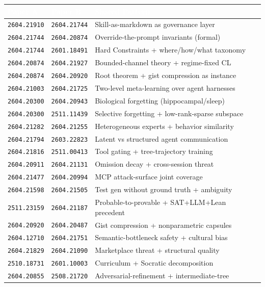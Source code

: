 \documentclass[11pt,letterpaper]{article}
\newcommand{\arxivid}[1]{\texttt{\textcolor{accent}{#1}}}
\newcommand{\tableheader}[1]{\textbf{\sffamily\textcolor{white}{#1}}}
\begin{document}
\begin{center}
\begin{tabularx}{\textwidth}{L{2.5cm}L{2.5cm}X}
\toprule
{}
\tableheader{Paper A} & \tableheader{Paper B} & \tableheader{Shared Pattern} \\
\midrule
\arxivid{2604.21910} & \arxivid{2604.21744} & Skill-as-markdown as governance layer \\
\arxivid{2604.21744} & \arxivid{2604.20874} & Override-the-prompt invariants (formal) \\
\arxivid{2604.21744} & \arxivid{2601.18491} & Hard Constraints + where/how/what taxonomy \\
\arxivid{2604.20874} & \arxivid{2604.21927} & Bounded-channel theory + regime-fixed CL \\
\arxivid{2604.20874} & \arxivid{2604.20920} & Root theorem + gist compression as instance \\
\arxivid{2604.21003} & \arxivid{2604.21725} & Two-level meta-learning over agent harnesses \\
\arxivid{2604.20300} & \arxivid{2604.20943} & Biological forgetting (hippocampal/sleep) \\
\arxivid{2604.20300} & \arxivid{2511.11439} & Selective forgetting + low-rank-sparse subspace \\
\arxivid{2604.21282} & \arxivid{2604.21255} & Heterogeneous experts + behavior similarity \\
\arxivid{2604.21794} & \arxivid{2603.22823} & Latent vs structured agent communication \\
\arxivid{2604.21816} & \arxivid{2511.00413} & Tool gating + tree-trajectory training \\
\arxivid{2604.20911} & \arxivid{2604.21131} & Omission decay + cross-session threat \\
\arxivid{2604.21477} & \arxivid{2604.20994} & MCP attack-surface joint coverage \\
\arxivid{2604.21598} & \arxivid{2604.21505} & Test gen without ground truth + ambiguity \\
\arxivid{2511.23159} & \arxivid{2604.21187} & Probable-to-provable + SAT+LLM+Lean precedent \\
\arxivid{2604.20920} & \arxivid{2604.20487} & Gist compression + nonparametric capsules \\
\arxivid{2604.12710} & \arxivid{2604.21751} & Semantic-bottleneck safety + cultural bias \\
\arxivid{2604.21829} & \arxivid{2604.21090} & Marketplace threat + structural quality \\
\arxivid{2510.18731} & \arxivid{2601.10003} & Curriculum + Socratic decomposition \\
\arxivid{2604.20855} & \arxivid{2508.21720} & Adversarial-refinement + intermediate-tree \\
\bottomrule
\end{tabularx}
\end{center}
\end{document}
